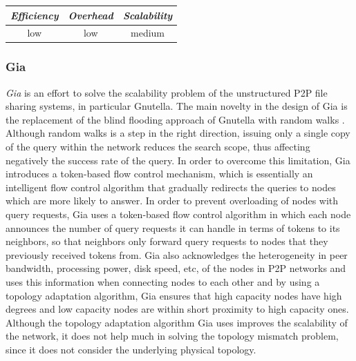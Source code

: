 \begin{center}
\begin{tabular}{ccc}
\emph{Efficiency} & \emph{Overhead} & \emph{Scalability} \\
\hline
%
low &
%
low &
%
medium
\end{tabular}
\end{center}

\subsubsection{Gia}
\emph{Gia} \cite{CRBLS2003} is an effort to solve the scalability
problem of the unstructured P2P file sharing systems, in particular Gnutella.
The main novelty in the design of Gia is the replacement of the blind flooding
approach of Gnutella with random walks \cite{lv_randomwalks_2002}. Although
random walks is a step in the right direction, issuing only a single copy of the
query within the network reduces the search scope, thus affecting negatively the
success rate of the query.  In order to overcome this limitation, Gia introduces
a token-based flow control mechanism, which is essentially an intelligent flow
control algorithm that gradually redirects the queries to nodes which are more
likely to answer. In order to prevent overloading of nodes with query requests,
Gia uses a token-based flow control algorithm in which each node announces the
number of query requests it can handle in terms of tokens to its neighbors, so
that neighbors only forward query requests to nodes that they previously
received tokens from. Gia also acknowledges the heterogeneity in peer bandwidth,
processing power, disk speed, etc, of the nodes in P2P networks and uses this
information when connecting nodes to each other and by using a topology
adaptation algorithm, Gia ensures that high capacity nodes have high degrees and
low capacity nodes are within short proximity to high capacity ones.
Although the topology adaptation algorithm Gia uses improves the scalability of
the network, it does not help much in solving the topology mismatch problem,
since it does not consider the underlying physical topology.

